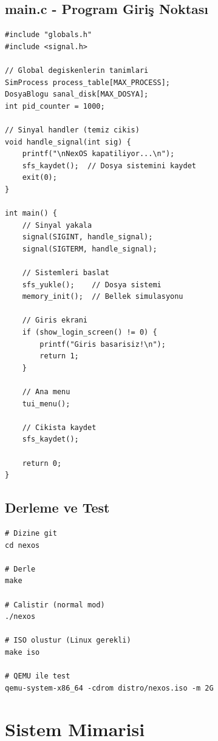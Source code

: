 \documentclass[12pt,a4paper]{report}
\begin{document}
\section{main.c - Program Giriş Noktası}

\begin{lstlisting}[caption={main.c - Temel Yapi}]
#include "globals.h"
#include <signal.h>

// Global degiskenlerin tanimlari
SimProcess process_table[MAX_PROCESS];
DosyaBlogu sanal_disk[MAX_DOSYA];
int pid_counter = 1000;

// Sinyal handler (temiz cikis)
void handle_signal(int sig) {
    printf("\nNexOS kapatiliyor...\n");
    sfs_kaydet();  // Dosya sistemini kaydet
    exit(0);
}

int main() {
    // Sinyal yakala
    signal(SIGINT, handle_signal);
    signal(SIGTERM, handle_signal);
    
    // Sistemleri baslat
    sfs_yukle();    // Dosya sistemi
    memory_init();  // Bellek simulasyonu
    
    // Giris ekrani
    if (show_login_screen() != 0) {
        printf("Giris basarisiz!\n");
        return 1;
    }
    
    // Ana menu
    tui_menu();
    
    // Cikista kaydet
    sfs_kaydet();
    
    return 0;
}
\end{lstlisting}

\section{Derleme ve Test}

\begin{lstlisting}[style=bashstyle,caption={Proje Derleme}]
# Dizine git
cd nexos

# Derle
make

# Calistir (normal mod)
./nexos

# ISO olustur (Linux gerekli)
make iso

# QEMU ile test
qemu-system-x86_64 -cdrom distro/nexos.iso -m 2G
\end{lstlisting}

\chapter{Sistem Mimarisi}
\end{document}
